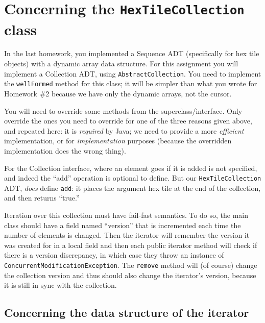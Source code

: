 \documentclass[11pt]{article}
\begin{document}
\section{Concerning the \texttt{HexTileCollection} class}

In the last homework, you implemented a \textsf{Sequence} ADT
(specifically for hex tile objects) with a dynamic array data structure.
For this assignment you will implement a \textsf{Collection} ADT,
using \texttt{AbstractCollection}.
You need to implement the \texttt{wellFormed} method for this class;
it will be simpler than what you wrote for Homework \#2 because we
have only the dynamic arrays, not the cursor.

You will need to override some
methods from the superclass/interface.  Only override the ones you
need to override for one of the three reasons given above, and
repeated here: it is \emph{required} by Java; we need to provide a
more \emph{efficient} implementation, or for \emph{implementation}
purposes (because the overridden implementation does the wrong thing).

For the \textsf{Collection} interface, where an element goes if it is
added is not specified, and indeed the ``add'' operation is optional to define.
But our \texttt{HexTileCollection} ADT, \emph{does} define \texttt{add}:
it places the argument hex tile at the end of the collection, and then
returns ``true.''

Iteration over this collection must have
fail-fast semantics.  To do so, the main class should have a field
named ``version'' that is incremented each time the number of elements
is changed. Then the iterator will remember the version it was created
for in a local field and then each public iterator method will check if
there is a version discrepancy, in which case they throw an instance
of \texttt{ConcurrentModificationException}.  The \texttt{remove}
method will (of course) change the collection version and thus should
also change the iterator's version, because it is still in sync with
the collection.

\subsection{Concerning the data structure of the iterator}
\end{document}
